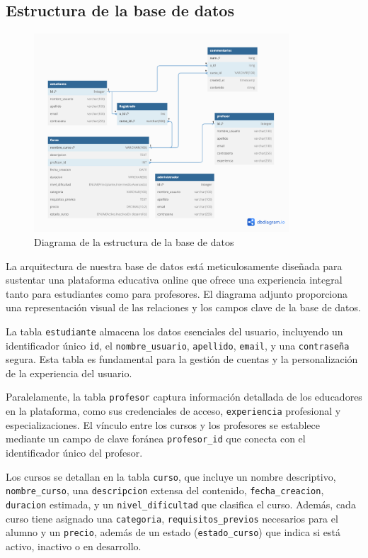 \documentclass[
]{article}
\begin{document}
\newpage

\subsection{Estructura de la base de
datos}\label{estructura-de-la-base-de-datos}

\begin{figure}
\centering
\includegraphics[width=0.85\textwidth,height=\textheight]{../img/diagrama.png}
\caption{Diagrama de la estructura de la base de datos}
\end{figure}

La arquitectura de nuestra base de datos está meticulosamente diseñada
para sustentar una plataforma educativa online que ofrece una
experiencia integral tanto para estudiantes como para profesores. El
diagrama adjunto proporciona una representación visual de las relaciones
y los campos clave de la base de datos.

La tabla \texttt{estudiante} almacena los datos esenciales del usuario,
incluyendo un identificador único \texttt{id}, el
\texttt{nombre\_usuario}, \texttt{apellido}, \texttt{email}, y una
\texttt{contraseña} segura. Esta tabla es fundamental para la gestión de
cuentas y la personalización de la experiencia del usuario.

Paralelamente, la tabla \texttt{profesor} captura información detallada
de los educadores en la plataforma, como sus credenciales de acceso,
\texttt{experiencia} profesional y especializaciones. El vínculo entre
los cursos y los profesores se establece mediante un campo de clave
foránea \texttt{profesor\_id} que conecta con el identificador único del
profesor.

Los cursos se detallan en la tabla \texttt{curso}, que incluye un nombre
descriptivo, \texttt{nombre\_curso}, una \texttt{descripcion} extensa
del contenido, \texttt{fecha\_creacion}, \texttt{duracion} estimada, y
un \texttt{nivel\_dificultad} que clasifica el curso. Además, cada curso
tiene asignado una \texttt{categoria}, \texttt{requisitos\_previos}
necesarios para el alumno y un \texttt{precio}, además de un estado
(\texttt{estado\_curso}) que indica si está activo, inactivo o en
desarrollo.
\end{document}
